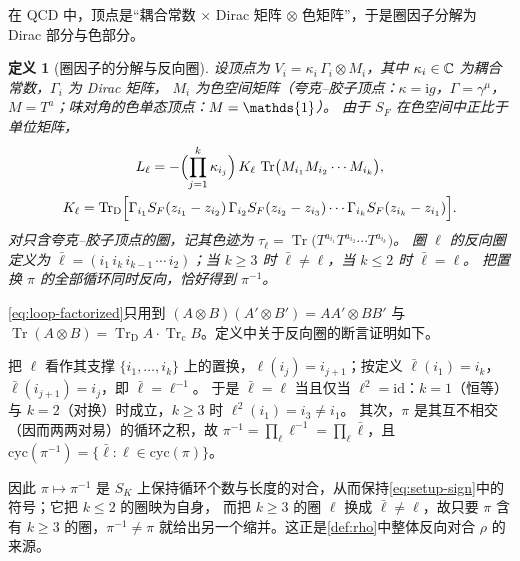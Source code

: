 \documentclass[UTF8,a4paper,11pt,fontset=fandol]{ctexart}
\makeatletter
\let\amsmathbb\mathbb
\renewcommand{\mathbb}[1]{\ifx1#1\mathds{1}\else\amsmathbb{#1}\fi}
\theoremstyle{cplain}
\theoremstyle{cdefinition}
\newtheorem{definition}[theorem]{定义}
\theoremstyle{cremark}
\renewcommand{\proofname}{证明}
\renewenvironment{proof}[1][\proofname]{\par\pushQED{\qed}\normalfont\topsep6\p@\@plus6\p@\relax
  \trivlist\item[\hskip\labelsep\itshape #1\hspace{0.5em}]\ignorespaces}{\popQED\endtrivlist\@endpefalse}
\numberwithin{equation}{section}
\DeclareMathOperator{\Tr}{Tr}
\newcommand{\TrD}{\operatorname{Tr}_{\mathrm{D}}}   %
\newcommand{\Trc}{\operatorname{Tr}_{\mathrm{c}}}   %
\newcommand{\SF}{S_{F}}                              %
\newcommand{\ii}{\mathrm{i}}                        %
\makeatother
\begin{document}
在 QCD 中，顶点是“耦合常数 $\times$ Dirac 矩阵 $\otimes$ 色矩阵”，于是圈因子分解为 Dirac 部分与色部分。

\begin{definition}[圈因子的分解与反向圈]\label{def:loop-factor}
设顶点为 $V_i=\kappa_i\,\Gamma_i\otimes M_i$，其中 $\kappa_i\in\mathbb C$ 为耦合常数，$\Gamma_i$ 为 Dirac 矩阵，
$M_i$ 为色空间矩阵（夸克--胶子顶点：$\kappa=\ii g$，$\Gamma=\gamma^\mu$，$M=T^a$；味对角的色单态顶点：$M=\mathbb 1$）。
由于 $\SF$ 在色空间中正比于单位矩阵，
\begin{equation}\label{eq:loop-factorized}
\begin{gathered}
L_\ell=-\Bigl(\prod_{j=1}^{k}\kappa_{i_j}\Bigr)\,K_\ell\,\Tr\bigl(M_{i_1}M_{i_2}\cdots M_{i_k}\bigr),\\
K_\ell=\TrD\Bigl[\Gamma_{i_1}\SF(z_{i_1}-z_{i_2})\,\Gamma_{i_2}\SF(z_{i_2}-z_{i_3})\cdots\Gamma_{i_k}\SF(z_{i_k}-z_{i_1})\Bigr].
\end{gathered}
\end{equation}
对只含夸克--胶子顶点的圈，记其色迹为 $\tau_\ell=\Tr\bigl(T^{a_{i_1}}T^{a_{i_2}}\cdots T^{a_{i_k}}\bigr)$。
圈 $\ell$ 的反向圈定义为 $\bar\ell=(i_1\,i_k\,i_{k-1}\,\cdots\,i_2)$；当 $k\ge3$ 时 $\bar\ell\neq\ell$，当 $k\le2$ 时 $\bar\ell=\ell$。
把置换 $\pi$ 的全部循环同时反向，恰好得到 $\pi^{-1}$。
\end{definition}

\cref{eq:loop-factorized}只用到 $(A\otimes B)(A'\otimes B')=AA'\otimes BB'$ 与 $\Tr(A\otimes B)=\TrD A\cdot\Trc B$。定义中关于反向圈的断言证明如下。

\begin{proof}[定义中断言的证明]
把 $\ell$ 看作其支撑 $\{i_1,\dots,i_k\}$ 上的置换，$\ell(i_j)=i_{j+1}$；按定义 $\bar\ell(i_1)=i_k$，$\bar\ell(i_{j+1})=i_j$，即 $\bar\ell=\ell^{-1}$。
于是 $\bar\ell=\ell$ 当且仅当 $\ell^2=\mathrm{id}$：$k=1$（恒等）与 $k=2$（对换）时成立，$k\ge3$ 时 $\ell^2(i_1)=i_3\neq i_1$。
其次，$\pi$ 是其互不相交（因而两两对易）的循环之积，故 $\pi^{-1}=\prod_{\ell}\ell^{-1}=\prod_\ell\bar\ell$，且 $\mathrm{cyc}(\pi^{-1})=\{\bar\ell:\ell\in\mathrm{cyc}(\pi)\}$。
\end{proof}

因此 $\pi\mapsto\pi^{-1}$ 是 $S_K$ 上保持循环个数与长度的对合，从而保持\cref{eq:setup-sign}中的符号；它把 $k\le2$ 的圈映为自身，
而把 $k\ge3$ 的圈 $\ell$ 换成 $\bar\ell\ne\ell$，故只要 $\pi$ 含有 $k\ge3$ 的圈，$\pi^{-1}\ne\pi$ 就给出另一个缩并。这正是\cref{def:rho}中整体反向对合 $\rho$ 的来源。
\end{document}
